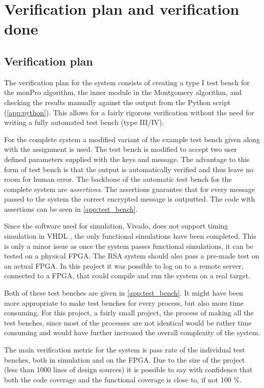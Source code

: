 \section{Verification plan and verification done}
%
\subsection{Verification plan}
The verification plan for the system consists of creating a type I test bench
\cite[p.244]{pedroni} for the monPro algorithm, the inner module in the Montgomery algorithm,
and checking the results manually against the output from the Python script (\cref{app:python}).
This allows for a fairly rigorous verification without the need for writing a fully
automated test bench (type III/IV). 

For the complete system a modified variant of the example test bench given along with the 
assignment is used. The test bench is modified to accept two user defined parameters 
supplied with the keys and message. The advantage to this form of test bench is that
the output is automatically verified and thus leave no room for human error. The backbone
of the automatic test bench for the complete system are \emph{assertions}. The assertions
guarantee that for every message passed to the system the correct encrypted message is outputted.
The code with assertions can be seen in \cref{app:test_bench}.

Since the software used for simulation, Vivado, does not support timing simulation in VHDL
\cite{vivado_timing_sim}, the only functional simulations have been completed. 
This is only a minor issue as once the system passes functional simulations, 
it can be tested on a physical FPGA. The RSA system should also pass a pre-made test on an actual
FPGA. In this project it was possible to log on to a remote server, connected to a FPGA, that could
compile and run the system on a real target. 

Both of these test benches are given in \cref{app:test_bench}. It might have been more
appropriate to make test benches for every process, but also more time consuming. For this
project, a fairly small project, the process of making all the test benches, since most of
the processes are not identical would be rather time consuming and would have further 
increased the overall complexity of the system. 

The main verification metric for the system is pass rate of the individual test benches, 
both in simulation and on the FPGA. Due to the size of the project (less than 1000 lines of 
design sources) it is possible to say with confidence that both the code coverage and the 
functional coverage is close to, if not 100 \%. 
%
